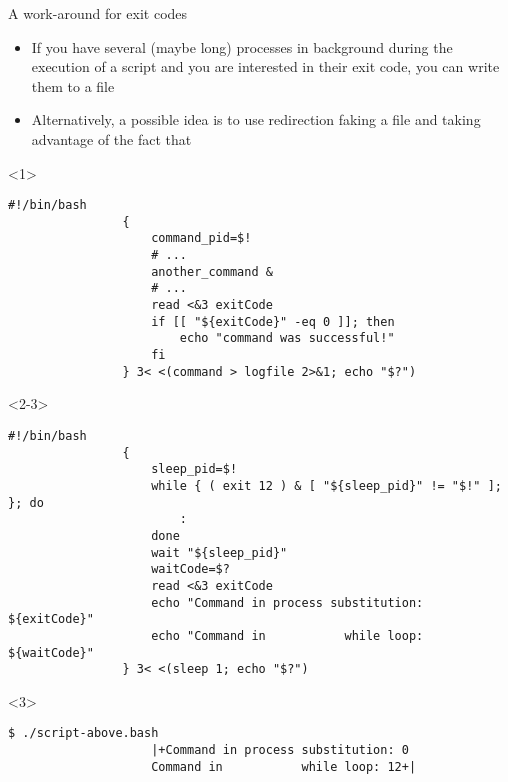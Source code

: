 \begin{frame}[fragile]{A work-around for exit codes}
    \vspace{-4mm}
    \begin{overlayarea}{\textwidth}{\textheight}
        \begin{itemize}
            \item If you have several (maybe long) processes in background during the execution of a script and you are interested in their exit code, you can write them to a file
            \item Alternatively, a possible idea is to use redirection faking a file and taking advantage of the fact that 
        \end{itemize}
        \begin{onlyenv}<1>
            \begin{lstlisting}[style=MyBash, emph={[7]command_pid, exitCode}, emph={[8]another_command}]
                #!/bin/bash
                {
                    command_pid=$!
                    # ...
                    another_command &
                    # ...
                    read <&3 exitCode
                    if [[ "${exitCode}" -eq 0 ]]; then
                        echo "command was successful!"
                    fi
                } 3< <(command > logfile 2>&1; echo "$?")
            \end{lstlisting}
        \end{onlyenv}
        \begin{onlyenv}<2-3>
            \begin{lstlisting}[style=MyBash, emph={[7]sleep_pid, exitCode, waitCode}, firstnumber=12]
                #!/bin/bash
                {
                    sleep_pid=$!
                    while { ( exit 12 ) & [ "${sleep_pid}" != "$!" ]; }; do
                        :
                    done
                    wait "${sleep_pid}"
                    waitCode=$?
                    read <&3 exitCode
                    echo "Command in process substitution: ${exitCode}"
                    echo "Command in           while loop: ${waitCode}"
                } 3< <(sleep 1; echo "$?")
            \end{lstlisting}
            \begin{uncoverenv}<3>
                \begin{lstlisting}[style=MyBash, numbers=none, aboveskip=1mm]
                    $ ./script-above.bash
                    |+Command in process substitution: 0
                    Command in           while loop: 12+|
                \end{lstlisting}
            \end{uncoverenv}
        \end{onlyenv}
    \end{overlayarea}
\end{frame}
